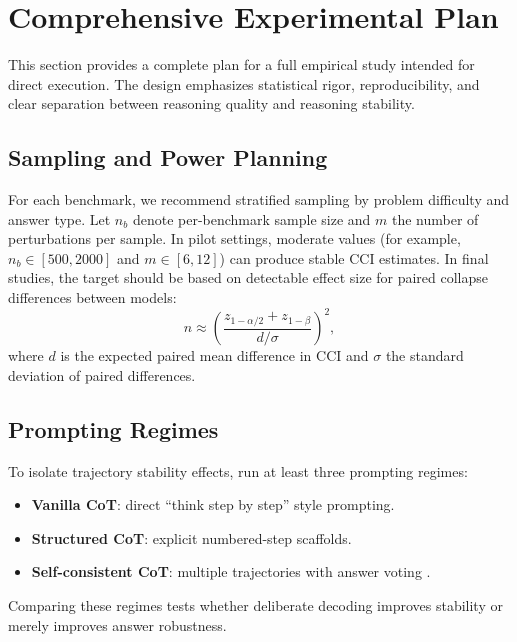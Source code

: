 \documentclass[conference]{IEEEtran}
\begin{document}
\begin{table}[!t]
\caption{Human Audit Rubric for Perturbation Validity}
\label{tab:rubric}
\centering
{}
\end{table}

\section{Comprehensive Experimental Plan}
This section provides a complete plan for a full empirical study intended for direct execution. The design emphasizes statistical rigor, reproducibility, and clear separation between reasoning quality and reasoning stability.

\subsection{Sampling and Power Planning}
For each benchmark, we recommend stratified sampling by problem difficulty and answer type. Let $n_b$ denote per-benchmark sample size and $m$ the number of perturbations per sample. In pilot settings, moderate values (for example, $n_b\in[500,2000]$ and $m\in[6,12]$) can produce stable CCI estimates. In final studies, the target should be based on detectable effect size for paired collapse differences between models:
\begin{equation}
n \approx \left(\frac{z_{1-\alpha/2}+z_{1-\beta}}{d/\sigma}\right)^2,
\end{equation}
where $d$ is the expected paired mean difference in CCI and $\sigma$ the standard deviation of paired differences.

\subsection{Prompting Regimes}
To isolate trajectory stability effects, run at least three prompting regimes:
\begin{itemize}[leftmargin=*]
\item \textbf{Vanilla CoT}: direct ``think step by step'' style prompting.
\item \textbf{Structured CoT}: explicit numbered-step scaffolds.
\item \textbf{Self-consistent CoT}: multiple trajectories with answer voting \cite{wang2022selfconsistency}.
\end{itemize}
Comparing these regimes tests whether deliberate decoding improves stability or merely improves answer robustness.
\end{document}
